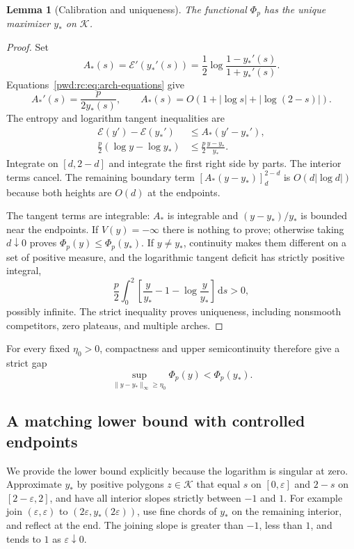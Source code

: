 \documentclass[11pt,letterpaper]{article}
\numberwithin{equation}{section}
\newtheorem{lemma}[theorem]{Lemma}
\theoremstyle{remark}\newtheorem{remark}[theorem]{Remark}
\newcommand{\K}{\mathcal K}\newcommand{\ee}{\mathrm e}\newcommand{\dd}{\,\mathrm d}
\begin{document}
\begin{lemma}[Calibration and uniqueness]\label{pwd:rc:lem:calibration}
The functional $\Phi_p$ has the unique maximizer $y_*$ on $\K$.
\end{lemma}
\begin{proof}
Set
\[
 A_*(s)=\mathcal E'(y_*'(s))
 =\frac12\log\frac{1-y_*'(s)}{1+y_*'(s)}.
\]
Equations~\eqref{pwd:rc:eq:arch-equations} give
\[
 A_*'(s)=\frac{p}{2y_*(s)},\qquad
 A_*(s)=O(1+|\log s|+|\log(2-s)|).
\]
The entropy and logarithm tangent inequalities are
\begin{align*}
 \mathcal E(y')-\mathcal E(y_*')&\le A_*(y'-y_*'),\\
 \frac p2(\log y-\log y_*)&\le\frac p2\frac{y-y_*}{y_*}.
\end{align*}
Integrate on $[d,2-d]$ and integrate the first right side by parts. The interior terms cancel. The remaining boundary term
$[A_*(y-y_*)]_d^{2-d}$ is $O(d|\log d|)$ because both heights are $O(d)$ at the endpoints.

The tangent terms are integrable: $A_*$ is integrable and $(y-y_*)/y_*$ is bounded near the endpoints. If $V(y)=-\infty$ there is nothing to prove; otherwise taking $d\downarrow0$ proves $\Phi_p(y)\le\Phi_p(y_*)$. If $y\ne y_*$, continuity makes them different on a set of positive measure, and the logarithmic tangent deficit has strictly positive integral,
\[
 \frac p2\int_0^2\left[\frac y{y_*}-1-\log\frac y{y_*}\right]\dd s>0,
\]
possibly infinite. The strict inequality proves uniqueness, including nonsmooth competitors, zero plateaus, and multiple arches.
\end{proof}
For every fixed $\eta_0>0$, compactness and upper semicontinuity therefore give a strict gap
\begin{equation}\label{pwd:rc:eq:gap}
 \sup_{\|y-y_*\|_\infty\ge\eta_0}\Phi_p(y)<\Phi_p(y_*).
\end{equation}

\subsection{A matching lower bound with controlled endpoints}
We provide the lower bound explicitly because the logarithm is singular at zero. Approximate $y_*$ by positive polygons $z\in\K$ that equal $s$ on $[0,\varepsilon]$ and $2-s$ on $[2-\varepsilon,2]$, and have all interior slopes strictly between $-1$ and $1$. For example join $(\varepsilon,\varepsilon)$ to $(2\varepsilon,y_*(2\varepsilon))$, use fine chords of $y_*$ on the remaining interior, and reflect at the end. The joining slope is greater than $-1$, less than $1$, and tends to $1$ as $\varepsilon\downarrow0$.
\end{document}
